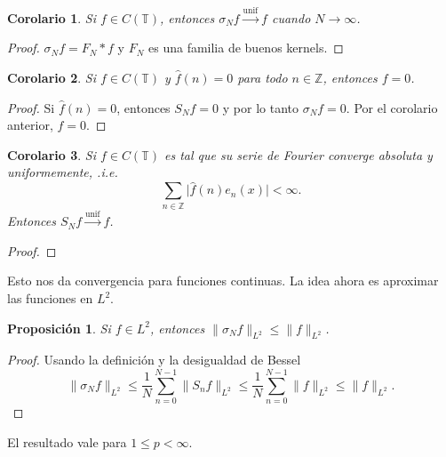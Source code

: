 \documentclass{article}
\newtheorem{Proposicion}{Proposición}
\newtheorem{Corolario}{Corolario}
\theoremstyle{plain}
\theoremstyle{definition}
\newcommand{\T}{\mathbb{T}}
\newcommand{\Z}{\mathbb{Z}}
\newcommand{\abs}[1]{\lvert #1 \rvert}
\newcommand{\normL}[2]{\lVert #2 \rVert_{L^#1}}
\begin{document}
\begin{Corolario}
  Si \(f\in C(\T)\), entonces \(\sigma_N f \xrightarrow{\text{unif}} f\) cuando \(N\to\infty\).   
\end{Corolario}
\begin{proof}
  \(\sigma_N f = F_N \ast f\) y \(F_N\) es una familia de buenos kernels.  
\end{proof}

\begin{Corolario}\label{cor:coeff f nulo impl f nulo}
  Si \(f\in C(\T)\) y \(\hat f(n) = 0\) para todo \(n\in \Z\), entonces \(f = 0\).   
\end{Corolario}
\begin{proof}
  Si \(\hat f(n) = 0\), entonces \(S_N f = 0\) y por lo tanto \(\sigma_N f = 0\). Por
  el corolario anterior, \(f = 0\). 
\end{proof}

\begin{Corolario}
  Si \(f\in C(\T)\) es tal que su serie de Fourier converge absoluta y uniformemente, .i.e.
  \begin{displaymath}
    \sum_{n\in\Z} \abs{ \hat f(n) e_n(x) } < \infty.
  \end{displaymath}
  Entonces \(S_N f \xrightarrow{\text{unif}} f\).
\end{Corolario}
\begin{proof}
\end{proof}

Esto nos da convergencia para funciones continuas. La idea ahora es aproximar las funciones
en \(L^2\).

\begin{Proposicion}
  Si \(f\in L^2\), entonces \(\normL{2}{\sigma_N f} \le \normL{2}{f}\).
\end{Proposicion}
\begin{proof}
  Usando la definición y la desigualdad de Bessel
  \begin{displaymath}
    \normL{2}{\sigma_N f}
    \le
    \frac{1}{N} \sum_{n=0}^{N-1} \normL{2}{S_n f}
    \le
    \frac{1}{N} \sum_{n=0}^{N-1} \normL{2}{f}
    \le \normL{2}{f}.
  \end{displaymath}
\end{proof}

El resultado vale para \(1 \le p <\infty\). 
\end{document}
